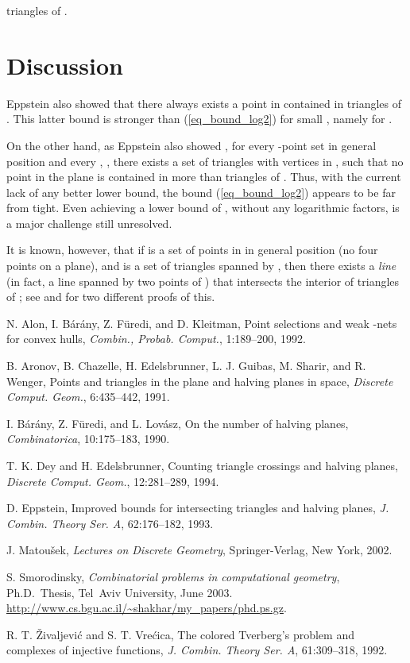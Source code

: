 \documentclass[11pt]{article}
\begin{document}
triangles of .

\section{Discussion}

Eppstein \cite{eppstein} also showed that there always exists a
point in  contained in  triangles of .
This latter bound is stronger than (\ref{eq_bound_log2}) for small
, namely for .

On the other hand, as Eppstein also showed \cite{eppstein}, for
every -point set  in general position and every , , there exists a set  of 
triangles with vertices in , such that no point in the plane is
contained in more than  triangles of . Thus, with the
current lack of any better lower bound, the bound
(\ref{eq_bound_log2}) appears to be far from tight. Even achieving a
lower bound of , without any logarithmic factors,
is a major challenge still unresolved.

It is known, however, that if  is a set of  points in  in general position (no four points on a plane), and  is a
set of  triangles spanned by , then there exists a \emph{line}
(in fact, a line spanned by two points of ) that intersects the
interior of  triangles of ; see \cite{DE} and
\cite{smo_phd} for two different proofs of this.

\begin{thebibliography}{9}

N. Alon, I. B\'ar\'any, Z. F\"uredi, and D. Kleitman, Point
selections and weak -nets for convex hulls, \emph{Combin.,
Probab. Comput.}, 1:189--200, 1992.

B. Aronov, B. Chazelle, H. Edelsbrunner, L. J. Guibas, M. Sharir,
and R. Wenger, Points and triangles in the plane and halving planes
in space, \emph{Discrete Comput. Geom.}, 6:435--442, 1991.

I. B\'ar\'any, Z. F\"uredi, and L. Lov\'asz, On the number of
halving planes, \emph{Combinatorica}, 10:175--183, 1990.

T. K. Dey and H. Edelsbrunner, Counting triangle crossings and
halving planes, \emph{Discrete Comput. Geom.}, 12:281--289, 1994.

 D. Eppstein, Improved bounds for intersecting
triangles and halving planes, \emph{J. Combin. Theory Ser. A},
62:176--182, 1993.

J. Matou\v sek, \emph{Lectures on Discrete Geometry},
Springer-Verlag, New York, 2002.

S. Smorodinsky, \emph{Combinatorial problems in computational
geometry}, Ph.D.~Thesis, Tel~Aviv University, June 2003.
\url{http://www.cs.bgu.ac.il/~shakhar/my_papers/phd.ps.gz}.

R. T. \v Zivaljevi\'c and S. T. Vre\'cica, The colored Tverberg's
problem and complexes of injective functions, \emph{J. Combin.
Theory Ser. A}, 61:309--318, 1992.

\end{thebibliography}
\end{document}
